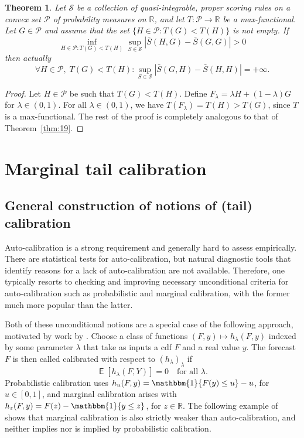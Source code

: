 \documentclass[12pt]{article}
\newcommand{\one}{\mathbbm{1}}
\newcommand{\E}{\operatorname{\mathsf{E}}}
\newcommand{\R}{\mathbb{R}}
\newcommand{\Pp}{\mathcal{P}}
\newcommand{\Ss}{\mathcal{S}}
\newcommand{\1}{\mathbf{1}} %
\newtheorem{theorem}[propo]{Theorem}
\theoremstyle{definition}
\begin{document}
\begin{theorem}\label{thm:20}
Let $\Ss$ be a collection of quasi-integrable, proper scoring rules on a convex set $\Pp$ of probability measures on $\R$, and let $T:\Pp \to \R$ be a max-functional. Let $G \in \Pp$ and assume that the set $\{ H \in \Pp : T(G) < T(H)\}$ is not empty. If 
\begin{equation*}
	\inf_{H \in \Pp : T(G) < T(H) }
	\sup_{S \in \Ss} 
	\left| \bar{S}(H, G) - \bar{S}(G, G) \right| 
	> 0
\end{equation*}
then actually
\[
	\forall H \in \Pp, \; T(G) < T(H) :
	\sup_{S \in \Ss} \left| \bar{S}(G, H) - \bar{S}(H, H) \right| = +\infty.
\]
\end{theorem}

\begin{proof}
Let $H \in \Pp$ be such that $T(G) < T(H)$. Define $F_\lambda = \lambda H + (1-\lambda) G$ for $\lambda \in (0, 1)$. For all $\lambda \in (0, 1)$, we have $T(F_\lambda)= T(H) > T(G)$, since $T$ is a max-functional. The rest of the proof is completely analogous to that of Theorem~\ref{thm:19}.
\end{proof}



\section{Marginal tail calibration}\label{app:marginal}

\subsection{General construction of notions of (tail) calibration}
Auto-calibration is a strong requirement and generally hard to assess empirically. There are statistical tests for auto-calibration, but natural diagnostic tools that identify reasons for a lack of auto-calibration are not available. Therefore, one typically resorts to checking and improving necessary unconditional criteria for auto-calibration such as probabilistic and marginal calibration, with the former much more popular than the latter.

Both of these unconditional notions are a special case of the following approach, motivated by work by \cite{Bashaykh2022}. Choose a class of functions $(F,y) \mapsto h_\lambda(F,y)$ indexed by some parameter $\lambda$ that take as inputs a cdf $F$ and a real value $y$. The forecast $F$ is then called calibrated with respect to $(h_\lambda)_\lambda$ if 
\[
\E[h_\lambda(F,Y)] = 0 \quad \text{for all $\lambda$.}
\]
Probabilistic calibration uses $h_u(F,y) = \one\{F(y)\le u\}-u$, for $u \in [0,1]$, and marginal calibration arises with $h_z(F,y) = F(z) - \one\{y \le z\}$, for $z \in \mathbb{R}$. The following example of \citet{GneitingEtAl2007} shows that marginal calibration is also strictly weaker than auto-calibration, and neither implies nor is implied by probabilistic calibration. 
\end{document}
